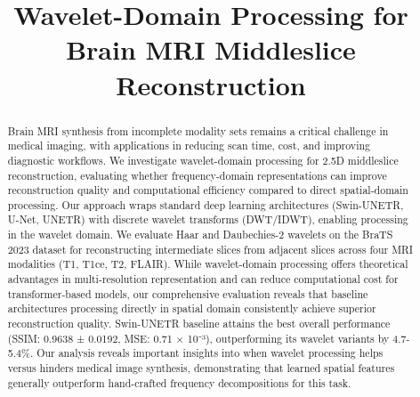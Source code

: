 \documentclass[conference]{IEEEtran}
\begin{document}
\title{Wavelet-Domain Processing for Brain MRI Middleslice Reconstruction}

\author{
\and
{}
}

\maketitle

\begin{abstract}
Brain MRI synthesis from incomplete modality sets remains a critical challenge in medical imaging, with applications in reducing scan time, cost, and improving diagnostic workflows. We investigate wavelet-domain processing for 2.5D middleslice reconstruction, evaluating whether frequency-domain representations can improve reconstruction quality and computational efficiency compared to direct spatial-domain processing. Our approach wraps standard deep learning architectures (Swin-UNETR, U-Net, UNETR) with discrete wavelet transforms (DWT/IDWT), enabling processing in the wavelet domain. We evaluate Haar and Daubechies-2 wavelets on the BraTS 2023 dataset for reconstructing intermediate slices from adjacent slices across four MRI modalities (T1, T1ce, T2, FLAIR). While wavelet-domain processing offers theoretical advantages in multi-resolution representation and can reduce computational cost for transformer-based models, our comprehensive evaluation reveals that baseline architectures processing directly in spatial domain consistently achieve superior reconstruction quality. Swin-UNETR baseline attains the best overall performance (SSIM: 0.9638 ± 0.0192, MSE: 0.71 × 10⁻³), outperforming its wavelet variants by 4.7-5.4\%. Our analysis reveals important insights into when wavelet processing helps versus hinders medical image synthesis, demonstrating that learned spatial features generally outperform hand-crafted frequency decompositions for this task.
\end{abstract}
\end{document}
